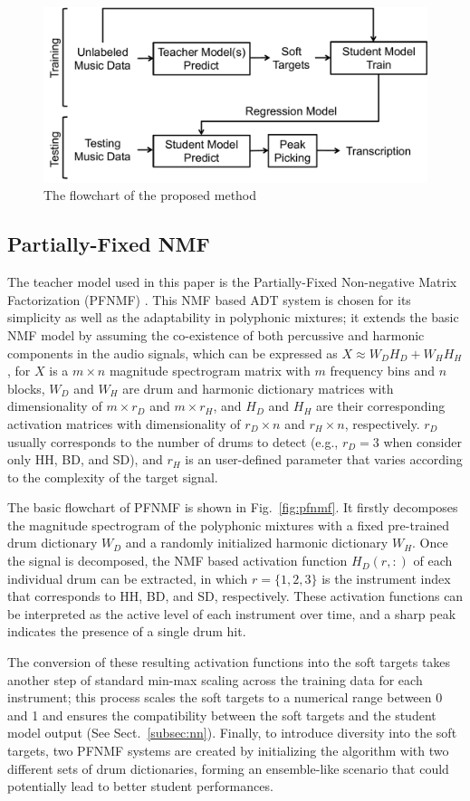 \documentclass{article}
\begin{document}
\begin{figure}
\centering
\includegraphics[width = 8 cm]{./figs/flowchart.pdf}
\caption{The flowchart of the proposed method}
\label{fig:flowchart}
\end{figure}

\subsection{Partially-Fixed NMF}
The teacher model used in this paper is the Partially-Fixed Non-negative Matrix Factorization (PFNMF) \cite{Wu2015a}. This NMF based ADT system is chosen for its simplicity as well as the adaptability in polyphonic mixtures; it extends the basic NMF model by assuming the co-existence of both percussive and harmonic components in the audio signals, which can be expressed as $X \approx W_{D}H_{D} + W_{H}H_{H}$, for $X$ is a $m \times n$ magnitude spectrogram matrix with $m$ frequency bins and $n$ blocks, $W_{D}$ and $W_{H}$ are drum and harmonic dictionary matrices with dimensionality of $m \times r_{D}$ and $m \times r_{H}$, and $H_{D}$ and $H_{H}$ are their corresponding activation matrices with dimensionality of $r_{D} \times n$ and $r_{H} \times n$, respectively. $r_{D}$ usually corresponds to the number of drums to detect (e.g., $r_{D} = 3$ when consider only HH, BD, and SD), and $r_{H}$ is an user-defined parameter that varies according to the complexity of the target signal. 

The basic flowchart of PFNMF is shown in Fig.~\ref{fig:pfnmf}. It firstly decomposes the magnitude spectrogram of the polyphonic mixtures with a fixed pre-trained drum dictionary $W_{D}$ and a randomly initialized harmonic dictionary $W_{H}$. Once the signal is decomposed, the NMF based activation function $H_{D}(r, :)$ of each individual drum can be extracted, in which $r = \{1, 2, 3\}$ is the instrument index that corresponds to HH, BD, and SD, respectively. These activation functions can be interpreted as the active level of each instrument over time, and a sharp peak indicates the presence of a single drum hit.

The conversion of these resulting activation functions into the soft targets takes another step of standard min-max scaling across the training data for each instrument; this process scales the soft targets to a numerical range between 0 and 1 and ensures the compatibility between the soft targets and the student model output (See Sect.~\ref{subsec:nn}). Finally, to introduce diversity into the soft targets, two PFNMF systems are created by initializing the algorithm with two different sets of drum dictionaries, forming an ensemble-like scenario that could potentially lead to better student performances. 
\end{document}
